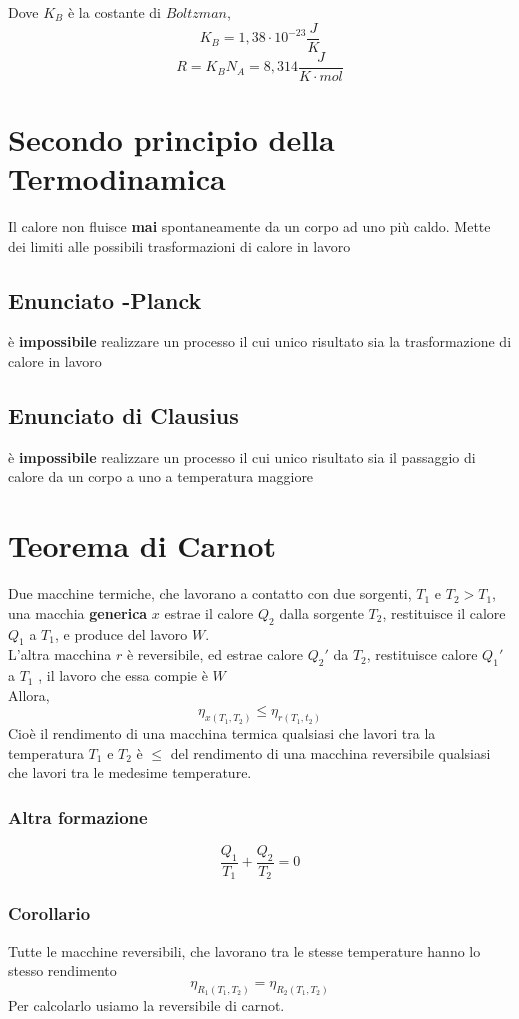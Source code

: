 \documentclass[a4paper]{report}
\begin{document}
  Dove $K_B$ è la costante di $Boltzman$,
  $$ K_B = 1,38 \cdot 10^{-23} \frac{J}{K}$$
  $$ R = K_B N_A = 8,314 \frac{J}{K \cdot mol} $$

  \section{Secondo principio della Termodinamica}
  Il calore non fluisce \textbf{mai} spontaneamente da un corpo ad uno più caldo.
  Mette dei limiti alle possibili trasformazioni di calore in lavoro
  \subsection{Enunciato -Planck}
  è \textbf{impossibile} realizzare un processo il cui unico risultato sia la trasformazione di calore in lavoro
  \subsection{Enunciato di Clausius}
  è \textbf{impossibile} realizzare un processo il cui unico risultato sia il passaggio di calore da un corpo a uno a temperatura maggiore

  \section{Teorema di Carnot}
  Due macchine termiche, che lavorano a contatto con due sorgenti, $T_1$ e $T_2 > T_1$, una macchia \textbf{generica} $x$ estrae il calore $Q_2$ dalla sorgente $T_2$, restituisce il calore $Q_1$ a $T_1$, e produce del lavoro $W$. \\
  L'altra macchina $r$ è reversibile, ed estrae calore $Q_2'$ da $T_2$, restituisce calore $Q_1'$ a $T_1$ , il lavoro che essa compie è $W$\\
  Allora,
  $$ \eta_{x(T_1, T_2)}  \leq \eta_{r(T_1, t_2)} $$
  Cioè il rendimento di una macchina termica qualsiasi che lavori tra la temperatura $T_1$ e $T_2$ è $\leq$ del rendimento di una macchina reversibile qualsiasi che lavori tra le medesime temperature.\\
  \subsubsection{Altra formazione}
  $$ \frac{Q_1}{T_1} + \frac{Q_2}{T_2} = 0 $$

  \subsubsection{Corollario}
  Tutte le macchine reversibili, che lavorano tra le stesse temperature hanno lo stesso rendimento
  $$ \eta_{R_1(T_1, T_2)} = \eta_{R_2(T_1, T_2)} $$
  Per calcolarlo usiamo la reversibile di carnot.
\end{document}
